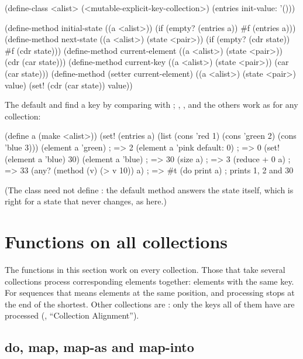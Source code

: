\begin{dylan}
(define-class <alist> (<mutable-explicit-key-collection>)
  (entries init-value: '()))

(define-method initial-state ((a <alist>))
  (if (empty? (entries a)) #f (entries a)))
(define-method next-state ((a <alist>) (state <pair>))
  (if (empty? (cdr state)) #f (cdr state)))
(define-method current-element ((a <alist>) (state <pair>))
  (cdr (car state)))
(define-method current-key ((a <alist>) (state <pair>))
  (car (car state)))
(define-method (setter current-element) ((a <alist>) (state <pair>) value)
  (set! (cdr (car state)) value))
\end{dylan}

\noindent The default  and  find a
key by comparing with \code{=}; , ,
 and the others work as for any collection:

\begin{dylan}
(define a (make <alist>))
(set! (entries a) (list (cons 'red 1) (cons 'green 2) (cons 'blue 3)))
(element a 'green)                ; => 2
(element a 'pink default: 0)      ; => 0
(set! (element a 'blue) 30)
(element a 'blue)                 ; => 30
(size a)                          ; => 3
(reduce + 0 a)                    ; => 33
(any? (method (v) (> v 10)) a)    ; => #t
(do print a)                      ; prints 1, 2 and 30
\end{dylan}

\noindent (The class need not define : the default
method answers the state itself, which is right for a state that
 never changes, as here.)

\section{Functions on all collections}\label{sec:collections-functions}

The functions in this section work on every collection. Those that take
several collections process corresponding elements together: elements
with the same key. For sequences that means elements at the same
position, and processing stops at the end of the shortest. Other
collections are : only the keys all of them have are
processed (, ``Collection Alignment'').

\subsection{do, map, map-as and map-into}

